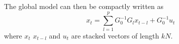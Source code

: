 \documentclass[preprint, 12pt]{elsarticle}
\newcommand{\?}{\stackrel{?}{=}}
\begin{document}
The global model can then be compactly written as
\begin{equation}
  \label{eq:6}
  x_{t} = \sum_{l=1}^{p}G_{0}^{-1}G_{l }x_{t-l} + G_{0}^{-1}u_{t}
\end{equation}
where $x_{t}$ $x_{t-l}$ and $u_{t}$ are stacked vectors of length $kN$.








\end{document}
